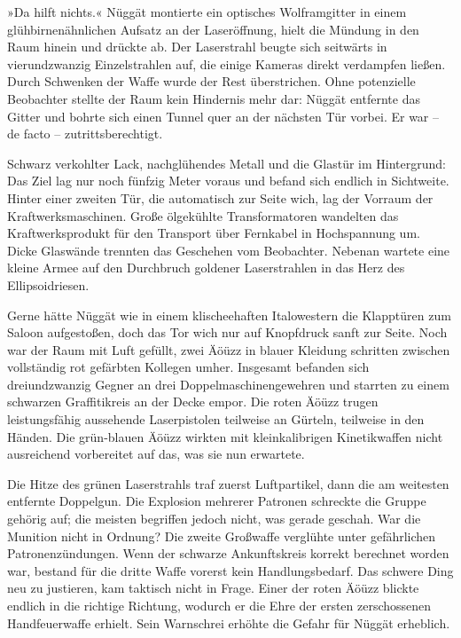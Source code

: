 »Da hilft nichts.« Nüggät montierte ein optisches Wolframgitter in einem glühbirnenähnlichen Aufsatz an der Laseröffnung, hielt die Mündung in den Raum hinein und drückte ab. Der Laserstrahl beugte sich seitwärts in vierundzwanzig Einzelstrahlen auf, die einige Kameras direkt verdampfen ließen. Durch Schwenken der Waffe wurde der Rest überstrichen. Ohne potenzielle Beobachter stellte der Raum kein Hindernis mehr dar: Nüggät entfernte das Gitter und bohrte sich einen Tunnel quer an der nächsten Tür vorbei. Er war – de facto – zutrittsberechtigt.

Schwarz verkohlter Lack, nachglühendes Metall und die Glastür im Hintergrund: Das Ziel lag nur noch fünfzig Meter voraus und befand sich endlich in Sichtweite. Hinter einer zweiten Tür, die automatisch zur Seite wich, lag der Vorraum der Kraftwerksmaschinen. Große ölgekühlte Transformatoren wandelten das Kraftwerksprodukt für den Transport über Fernkabel in Hochspannung um. Dicke Glaswände trennten das Geschehen vom Beobachter. Nebenan wartete eine kleine Armee auf den Durchbruch goldener Laserstrahlen in das Herz des Ellipsoidriesen.

Gerne hätte Nüggät wie in einem klischeehaften Italowestern die Klapptüren zum Saloon aufgestoßen, doch das Tor wich nur auf Knopfdruck sanft zur Seite. Noch war der Raum mit Luft gefüllt, zwei Äöüzz in blauer Kleidung schritten zwischen vollständig rot gefärbten Kollegen umher. Insgesamt befanden sich dreiundzwanzig Gegner an drei Doppelmaschinengewehren und starrten zu einem schwarzen Graffitikreis an der Decke empor. Die roten Äöüzz trugen leistungsfähig aussehende Laserpistolen teilweise an Gürteln, teilweise in den Händen. Die grün-blauen Äöüzz wirkten mit kleinkalibrigen Kinetikwaffen nicht ausreichend vorbereitet auf das, was sie nun erwartete.

Die Hitze des grünen Laserstrahls traf zuerst Luftpartikel, dann die am weitesten entfernte Doppelgun. Die Explosion mehrerer Patronen schreckte die Gruppe gehörig auf; die meisten begriffen jedoch nicht, was gerade geschah. War die Munition nicht in Ordnung? Die zweite Großwaffe verglühte unter gefährlichen Patronenzündungen. Wenn der schwarze Ankunftskreis korrekt berechnet worden war, bestand für die dritte Waffe vorerst kein Handlungsbedarf. Das schwere Ding neu zu justieren, kam taktisch nicht in Frage. Einer der roten Äöüzz blickte endlich in die richtige Richtung, wodurch er die Ehre der ersten zerschossenen Handfeuerwaffe erhielt. Sein Warnschrei erhöhte die Gefahr für Nüggät erheblich.

